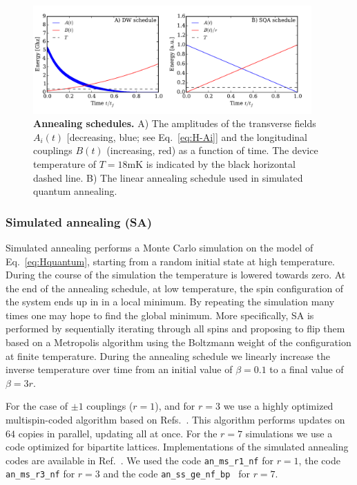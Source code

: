 %
\begin{figure}
\centering
\includegraphics[width=0.95\textwidth]{sfigures/sfig01.pdf}
\caption{{\bf Annealing schedules.} A) The amplitudes of the transverse fields $A_i(t)$ [decreasing, blue; see Eq.~\eqref{eq:H-Ai}] and the longitudinal couplings $B(t)$ (increasing, red) as a function of time. The device temperature of $T=18$mK is indicated by the black horizontal dashed line. B) The linear annealing schedule used in simulated quantum annealing.}
\label{fig:schedule}
\end{figure}
%
%

\subsubsection{Simulated annealing (SA)}
\label{sec:simulated-annealing}
Simulated annealing \cite{Kirkpatrick1983} performs a Monte Carlo simulation on the model of Eq.~\eqref{eq:Hquantum}, starting from a random initial state at high temperature. During the course of the simulation the temperature is lowered towards zero. At the end of the annealing schedule, at low temperature, the spin configuration of the system ends up in  in a local minimum. By repeating the simulation many times one may hope to find the global minimum. More specifically, SA is performed by sequentially iterating  through all spins and proposing to flip them based on a Metropolis algorithm using the Boltzmann weight of the configuration at finite temperature. During the annealing schedule we linearly increase the inverse temperature over time from an initial value of $\beta=0.1$ to a final value of $\beta=3r$.


For the case of $\pm1$ couplings ($r=1$), and  for $r=3$ we use a highly optimized multispin-coded algorithm based on Refs.~\cite{J.Stat.Phys.44.985,Comput.Phys.Commun.59.387}. This algorithm performs updates on $64$ copies in parallel, updating all at once. For the $r=7$ simulations we use a code optimized for bipartite lattices. Implementations of the simulated annealing codes are available in Ref.~\cite{sapaper}. We used the code {\tt an\_ms\_r1\_nf} for $r=1$, the code {\tt an\_ms\_r3\_nf} for $r=3$ and the code {\tt an\_ss\_ge\_nf\_bp } for $r=7$.\\


